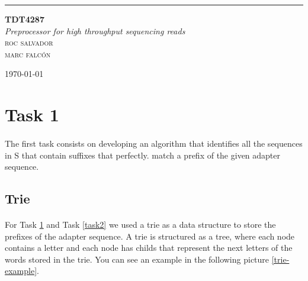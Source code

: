 \documentclass[a4paper,10pt]{article}
\begin{document}
\begin{titlepage} %
	
	\raggedleft %
	
	\rule{1pt}{\textheight} %
	\hspace{0.02\textwidth} %
	\parbox[b]{0.75\textwidth}{ %
		
		{\Huge\bfseries TDT4287}\\[2\baselineskip] %
		{\large\textit{Preprocessor for high throughput sequencing reads}}\\[4\baselineskip] %
		{\Large\textsc{roc salvador\\marc falcón}} %
		
		\vspace{0.5\textheight} %
		
		{\noindent \today}\\[\baselineskip] %
	}

\end{titlepage}


\tableofcontents

\newpage

\section{Task 1} \label{task1}

\paragraph{} The first task consists on developing an algorithm that identifies all the sequences in S that contain suffixes that perfectly.
match a prefix of the given adapter sequence.

\subsection{Trie}

\paragraph{} For Task \ref{task1} and Task \ref{task2} we used a trie as a data structure to store the prefixes of the adapter sequence.
A trie is structured as a tree, where each node contains a letter and each node has childs that represent the next letters of the words stored in the trie. 
You can see an example in the following picture \ref{trie-example}.
\end{document}
